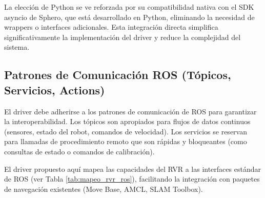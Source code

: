 \documentclass[11pt]{article}
\numberwithin{figure}{section}
\numberwithin{table}{section}
\begin{document}
La elección de Python se ve reforzada por su compatibilidad nativa con el SDK asyncio de Sphero, que está desarrollado en Python, eliminando la necesidad de wrappers o interfaces adicionales. Esta integración directa simplifica significativamente la implementación del driver y reduce la complejidad del sistema.


\subsection{Patrones de Comunicación ROS (Tópicos, Servicios, Actions)}

El driver debe adherirse a los patrones de comunicación de ROS para garantizar la interoperabilidad. Los tópicos son apropiados para flujos de datos continuos (sensores, estado del robot, comandos de velocidad). Los servicios se reservan para llamadas de procedimiento remoto que son rápidas y bloqueantes (como consultas de estado o comandos de calibración).

El driver propuesto aquí mapea las capacidades del RVR a las interfaces estándar de ROS (ver Tabla \ref{tab:mapeo_rvr_ros}), facilitando la integración con paquetes de navegación existentes (Move Base, AMCL, SLAM Toolbox).
\end{document}
